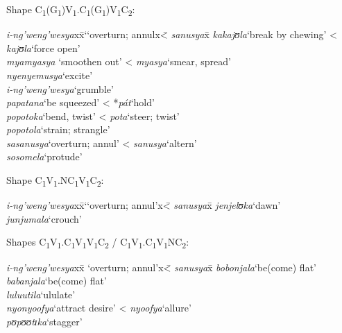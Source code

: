 \begin{exe}
\ex \begin{xlist} \label{exPartieleWithSuffixes}
\ex Shape C\textsubscript{1}(G\textsubscript{1})V\textsubscript{1}.C\textsubscript{1}(G\textsubscript{1})V\textsubscript{1}C\textsubscript{2}:
\begin{tabbing}
\textit{i-ng'weng'wesya}x\=x\lq `overturn; annulx\=< \textit{sanusya}x\=\kill%
\textit{kakajʊla}\>`break by chewing'\> < \textit{kajʊla}\>`force open'\\
\textit{myamyasya}\> \lq smoothen out'\> < \textit{myasya}\>`smear, spread'\\
\textit{nyenyemusya}\>`excite'\\
\textit{i-ng'weng'wesya}\>`grumble'\\
\textit{papatana}\>`be squeezed'\> < *\textit{pát}\>`hold'\\
\textit{popotoka}\>`bend, twist'\> < \textit{pota}\>`steer; twist'\\
\textit{popotola}\>`strain; strangle'\\
\textit{sasanusya}\>`overturn; annul'\> <
\textit{sanusya}\>\lq altern'\\
\textit{sosomela}\>`protude'
\end{tabbing}
\ex Shape C\textsubscript{1}V\textsubscript{1}.NC\textsubscript{1}V\textsubscript{1}C\textsubscript{2}:
\begin{tabbing}
\textit{i-ng'weng'wesya}x\=x\lq `overturn; annul'x\=< \textit{sanusya}x\=\kill%
\textit{jenjelʊka}\>`dawn'\\
\textit{junjumala}\>`crouch'
\end{tabbing}
\ex Shapes C\textsubscript{1}V\textsubscript{1}.C\textsubscript{1}V\textsubscript{1}V\textsubscript{1}C\textsubscript{2} / C\textsubscript{1}V\textsubscript{1}.C\textsubscript{1}V\textsubscript{1}NC\textsubscript{2}:
\begin{tabbing}
\textit{i-ng'weng'wesya}x\=x `overturn; annul'x\=< \textit{sanusya}x\=\kill%
\textit{bobonjala}\>`be(come) flat'\\
\textit{babanjala}\>`be(come) flat'\\
\textit{luluutila}\>\lq ululate'\\
\textit{nyonyoofya}\>`attract desire'\> < \textit{nyoofya}\>`allure'\\
\textit{pʊpʊʊtɪka}\>`stagger'
\end{tabbing}
\end{xlist}
\end{exe}
